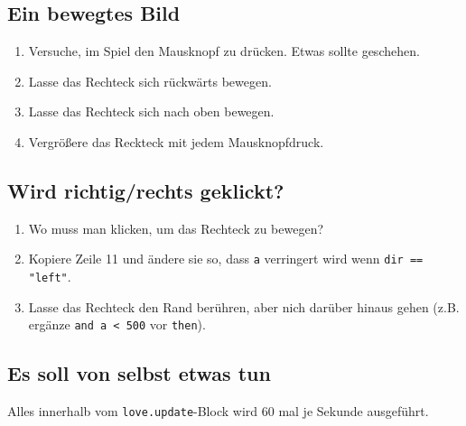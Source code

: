 \documentclass[a4paper, 11pt]{article}
\begin{document}
\subsection{Ein bewegtes Bild}



\begin{enumerate} 
\item Versuche, im Spiel den Mausknopf zu drücken. Etwas sollte geschehen.
\item Lasse das Rechteck sich rückwärts bewegen.
\item Lasse das Rechteck sich nach oben bewegen.
\item Vergrößere das Reckteck mit jedem Mausknopfdruck.
\end{enumerate}

\subsection{Wird richtig/rechts geklickt?}



\begin{enumerate} 
\item Wo muss man klicken, um das Rechteck zu bewegen?
\item Kopiere Zeile 11 und ändere sie so, dass \texttt{a} verringert wird wenn \texttt{dir == "left"}.
\item Lasse das Rechteck den Rand berühren, aber nich darüber hinaus gehen (z.B. ergänze \texttt{and a < 500} vor \texttt{then}).
\end{enumerate}

\subsection{Es soll von selbst etwas tun}



Alles innerhalb vom \texttt{love.update}-Block wird 60 mal je Sekunde ausgeführt.
\newline
\end{document}
